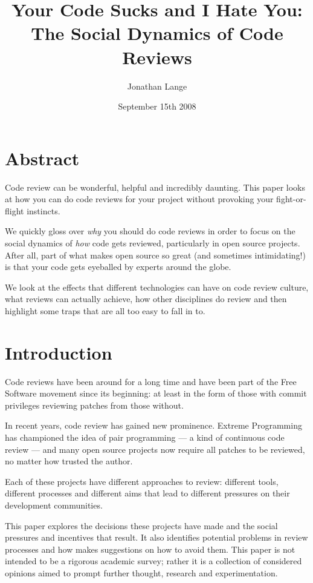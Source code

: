 \documentclass{article}
\begin{document}
\title{
  Your Code Sucks and I Hate You: The Social Dynamics of Code Reviews
}
\author{
  Jonathan Lange
}
\date{
  September 15th 2008
}

\maketitle
\tableofcontents



\section{Abstract}

Code review can be wonderful, helpful and incredibly daunting. This paper looks at how you can do code reviews for your project without provoking your fight-or-flight instincts.

We quickly gloss over {\it why} you should do code reviews in order to focus on the social dynamics of {\it how} code gets reviewed, particularly in open source projects. After all, part of what makes open source so great (and sometimes intimidating!) is that your code gets eyeballed by experts around the globe.

We look at the effects that different technologies can have on code review culture, what reviews can actually achieve, how other disciplines do review and then highlight some traps that are all too easy to fall in to.


\section{Introduction}

Code reviews have been around for a long time and have been part of the Free Software movement since its beginning: at least in the form of those with commit privileges reviewing patches from those without.

In recent years, code review has gained new prominence. Extreme Programming has championed the idea of pair programming --- a kind of continuous code review --- and many open source projects now require all patches to be reviewed, no matter how trusted the author.

Each of these projects have different approaches to review: different tools, different processes and different aims that lead to different pressures on their development communities.

This paper explores the decisions these projects have made and the social pressures and incentives that result. It also identifies potential problems in review processes and how makes suggestions on how to avoid them. This paper is not intended to be a rigorous academic survey; rather it is a collection of considered opinions aimed to prompt further thought, research and experimentation. 
\end{document}
